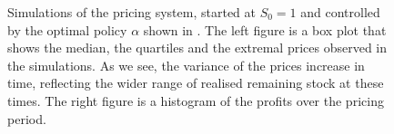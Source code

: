 \documentclass[main.tex]{subfiles}
\begin{document}
\begin{figure}[htbp]
  \caption{Simulations of the pricing system, started at $S_0=1$ %
    and
    controlled by the optimal policy $\alpha$ shown in
    .
    The left figure is a box plot
    that shows the median, the quartiles and the extremal prices observed
    in the simulations.
    As we see, the variance of the prices increase
    in time, reflecting the wider range of realised remaining stock at these times.
    The right figure is a histogram of the profits over
    the pricing period.
  }\label{fig:bellman_simulation}
\end{figure}


\biblio
\end{document}
